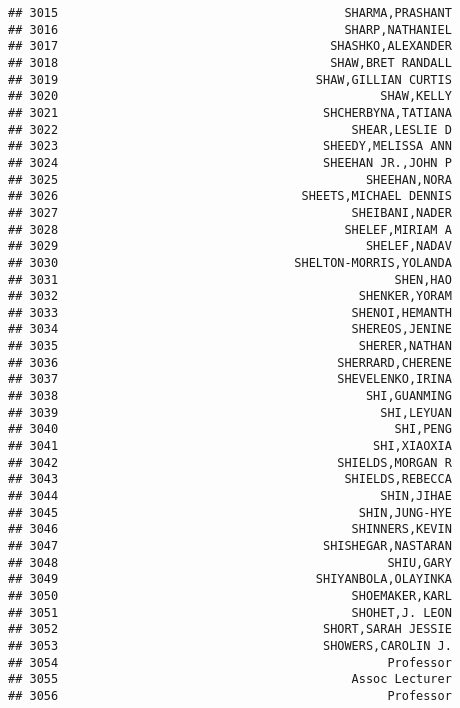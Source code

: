 \documentclass[
]{article}
\begin{document}
\begin{verbatim}
## 3015                                        SHARMA,PRASHANT
## 3016                                        SHARP,NATHANIEL
## 3017                                      SHASHKO,ALEXANDER
## 3018                                      SHAW,BRET RANDALL
## 3019                                    SHAW,GILLIAN CURTIS
## 3020                                             SHAW,KELLY
## 3021                                     SHCHERBYNA,TATIANA
## 3022                                         SHEAR,LESLIE D
## 3023                                     SHEEDY,MELISSA ANN
## 3024                                     SHEEHAN JR.,JOHN P
## 3025                                           SHEEHAN,NORA
## 3026                                  SHEETS,MICHAEL DENNIS
## 3027                                         SHEIBANI,NADER
## 3028                                        SHELEF,MIRIAM A
## 3029                                           SHELEF,NADAV
## 3030                                 SHELTON-MORRIS,YOLANDA
## 3031                                               SHEN,HAO
## 3032                                          SHENKER,YORAM
## 3033                                         SHENOI,HEMANTH
## 3034                                         SHEREOS,JENINE
## 3035                                          SHERER,NATHAN
## 3036                                       SHERRARD,CHERENE
## 3037                                       SHEVELENKO,IRINA
## 3038                                           SHI,GUANMING
## 3039                                             SHI,LEYUAN
## 3040                                               SHI,PENG
## 3041                                            SHI,XIAOXIA
## 3042                                       SHIELDS,MORGAN R
## 3043                                        SHIELDS,REBECCA
## 3044                                             SHIN,JIHAE
## 3045                                          SHIN,JUNG-HYE
## 3046                                         SHINNERS,KEVIN
## 3047                                     SHISHEGAR,NASTARAN
## 3048                                              SHIU,GARY
## 3049                                    SHIYANBOLA,OLAYINKA
## 3050                                         SHOEMAKER,KARL
## 3051                                         SHOHET,J. LEON
## 3052                                     SHORT,SARAH JESSIE
## 3053                                     SHOWERS,CAROLIN J.
## 3054                                              Professor
## 3055                                         Assoc Lecturer
## 3056                                              Professor

\end{verbatim}
\end{document}

